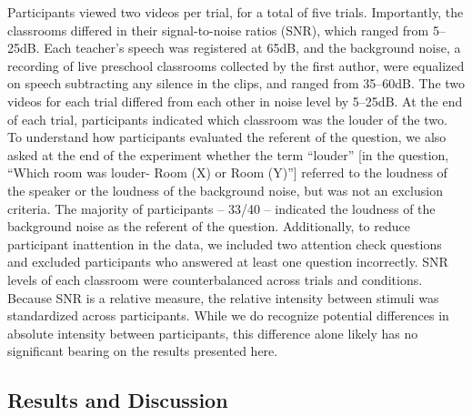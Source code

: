 \documentclass[10pt, letterpaper]{article}
\begin{document}
Participants viewed two videos per trial, for a total of five trials.
Importantly, the classrooms differed in their signal-to-noise ratios
(SNR), which ranged from 5--25dB. Each teacher's speech was registered
at 65dB, and the background noise, a recording of live preschool
classrooms collected by the first author, were equalized on speech
subtracting any silence in the clips, and ranged from 35--60dB. The two
videos for each trial differed from each other in noise level by
5--25dB. At the end of each trial, participants indicated which
classroom was the louder of the two. To understand how participants
evaluated the referent of the question, we also asked at the end of the
experiment whether the term ``louder'' {[}in the question, ``Which room
was louder- Room (X) or Room (Y)''{]} referred to the loudness of the
speaker or the loudness of the background noise, but was not an
exclusion criteria. The majority of participants -- 33/40 -- indicated
the loudness of the background noise as the referent of the question.
Additionally, to reduce participant inattention in the data, we included
two attention check questions and excluded participants who answered at
least one question incorrectly. SNR levels of each classroom were
counterbalanced across trials and conditions. Because SNR is a relative
measure, the relative intensity between stimuli was standardized across
participants. While we do recognize potential differences in absolute
intensity between participants, this difference alone likely has no
significant bearing on the results presented here.

\hypertarget{results-and-discussion}{%
\subsection{Results and Discussion}\label{results-and-discussion}}
\end{document}
